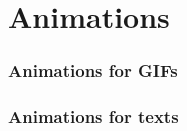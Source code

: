 \section{Animations}
    \begin{frame}
        \frametitle{Animations for GIFs}
    \end{frame}

    \begin{frame}
        \frametitle{Animations for texts}
    \end{frame}